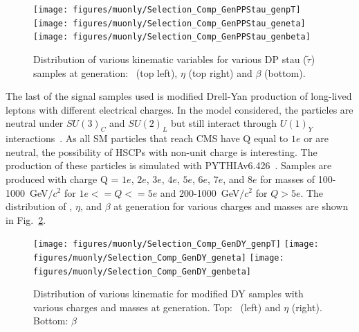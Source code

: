 \begin{figure}
 \begin{center}
  \texttt{[image: figures/muonly/Selection\_Comp\_GenPPStau\_genpT]}
  \texttt{[image: figures/muonly/Selection\_Comp\_GenPPStau\_geneta]}
  \texttt{[image: figures/muonly/Selection\_Comp\_GenPPStau\_genbeta]}
 \end{center}
 \caption[Distribution of \pt, $\eta$, and $\beta$ for various DP stau samples at generation]
{Distribution of various kinematic variables for various DP stau ($\tilde{\tau}$) samples at generation:
\pt\ (top left), $\eta$ (top right) and $\beta$ (bottom).
   \label{fig:GenPPStau}}
\end{figure}

The last of the signal samples used is modified Drell-Yan production of long-lived leptons with different electrical charges.
In the model considered, the particles are neutral under $SU(3)_C$ and $SU(2)_L$ but still interact through $U(1)_Y$ interactions~\cite{Langacker:2011db}.
As all SM particles that reach CMS have Q equal to $1e$ or
are neutral, the possibility of HSCPs with non-unit charge is interesting. 
The production of these particles is simulated with PYTHIAv6.426~\cite{Sjostrand:2006za}. 
Samples are produced with charge Q = $1e$, $2e$, $3e$, $4e$, $5e$, $6e$, $7e$, and $8e$ for masses of 
100-1000~GeV$/c^2$ for $1e <= Q <= 5e$ and 200-1000~GeV$/c^2$ for $Q > 5e$.
The distribution of \pt, $\eta$, and $\beta$ at generation for various charges and masses are shown in Fig.~\ref{fig:GenDY}.

\begin{figure}
 \begin{center}
  \texttt{[image: figures/muonly/Selection\_Comp\_GenDY\_genpT]}
  \texttt{[image: figures/muonly/Selection\_Comp\_GenDY\_geneta]}
  \texttt{[image: figures/muonly/Selection\_Comp\_GenDY\_genbeta]}
 \end{center}
 \caption[Distribution of \pt, $\eta$, and $\beta$ for modified DY samples with various charges and masses at generation]
{Distribution of various kinematic for modified DY samples with various charges and masses at generation.
Top: \pt\ (left) and $\eta$ (right).
Bottom: $\beta$}
   \label{fig:GenDY}
\end{figure}

